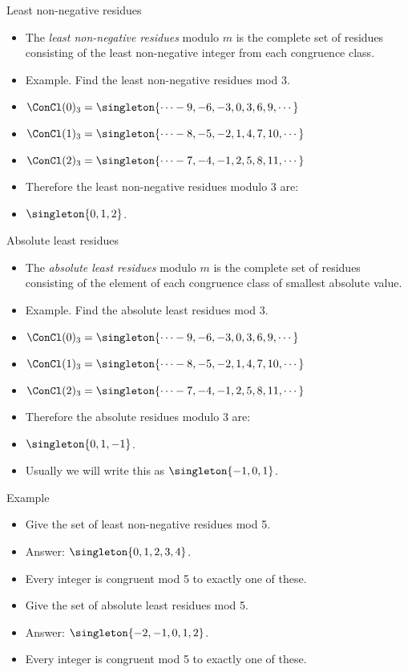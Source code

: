 \documentclass{beamer}
\begin{document}
\begin{frame}{Least non-negative residues}

\begin{itemize}
  \item  The \emph{least non-negative residues} modulo $m$ is the complete set of residues
  consisting of the least non-negative integer from each congruence class.
  \item Example. Find the least non-negative residues mod $3$.
  \item $\ConCl(0)_3 = \singleton{\cdots -9, -6, -3, 0, 3, 6, 9,\cdots}$
  \item $\ConCl(1)_3 = \singleton{\cdots -8, -5, -2, 1, 4, 7, 10,\cdots}$
  \item $\ConCl(2)_3 = \singleton{\cdots -7, -4, -1, 2, 5, 8, 11,\cdots}$
  \item Therefore the least non-negative residues modulo 3 are:
  \item $\singleton{0,1,2}$.
\end{itemize}

\end{frame}

\begin{frame}{Absolute least residues}

\begin{itemize}
  \item  The \emph{absolute least residues} modulo $m$ is the complete set of residues
  consisting of the element of each congruence class of smallest absolute value.
  \item Example. Find the absolute least residues mod $3$.
 \item $\ConCl(0)_3 = \singleton{\cdots -9, -6, -3, 0, 3, 6, 9,\cdots}$
  \item $\ConCl(1)_3 = \singleton{\cdots -8, -5, -2, 1, 4, 7, 10,\cdots}$
  \item $\ConCl(2)_3 = \singleton{\cdots -7, -4, -1, 2, 5, 8, 11,\cdots}$
  \item Therefore the absolute residues modulo 3 are:
  \item $\singleton{0,1,-1}$.
  \item Usually we will write this as $\singleton{-1,0,1}$.
\end{itemize}

\end{frame}

\begin{frame}{Example}

\begin{itemize}
  \item  Give the set of least non-negative residues mod 5.
  \item Answer: $\singleton{0,1,2,3,4}$.
  \item Every integer is congruent mod 5 to exactly one of these.
  \item Give the set of absolute least residues mod 5.
  \item Answer: $\singleton{-2,-1,0,1,2}$.
  \item Every integer is congruent mod 5 to exactly one of these.
\end{itemize}

\end{frame}
\end{document}
